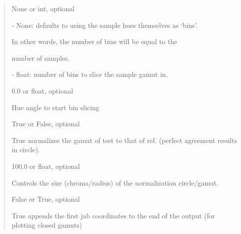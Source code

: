 \documentclass[letterpaper,10pt,english]{sphinxmanual}
\begin{document}
\begin{fulllineitems}
\begin{description}
\begin{quote}
\begin{description}
\item[{nhbins}] \leavevmode
\begin{DUlineblock}{0em}
\item[] None or int, optional
\item[]
\begin{DUlineblock}{\DUlineblockindent}
\item[] - None: defaults to using the sample hues themselves as ‘bins’. 
\item[]
\begin{DUlineblock}{\DUlineblockindent}
\item[] In other words, the number of bins will be equal to the 
\item[] number of samples.
\end{DUlineblock}
\item[] - float: number of bins to slice the sample gamut in.
\end{DUlineblock}
\end{DUlineblock}

\item[{start\_hue}] \leavevmode
\begin{DUlineblock}{0em}
\item[] 0.0 or float, optional
\item[] Hue angle to start bin slicing
\end{DUlineblock}

\item[{normalize\_gamut}] \leavevmode
\begin{DUlineblock}{0em}
\item[] True or False, optional
\item[] True normalizes the gamut of test to that of ref.
(perfect agreement results in circle).
\end{DUlineblock}

\item[{normalized\_chroma\_ref}] \leavevmode
\begin{DUlineblock}{0em}
\item[] 100.0 or float, optional
\item[] Controls the size (chroma/radius) of the normalization circle/gamut.
\end{DUlineblock}

\item[{close\_gamut}] \leavevmode
\begin{DUlineblock}{0em}
\item[] False or True, optional
\item[] True appends the first jab coordinates to the end of the output 
(for plotting closed gamuts)
\end{DUlineblock}


\end{description}
\end{quote}
\end{description}
\end{fulllineitems}
\end{document}
